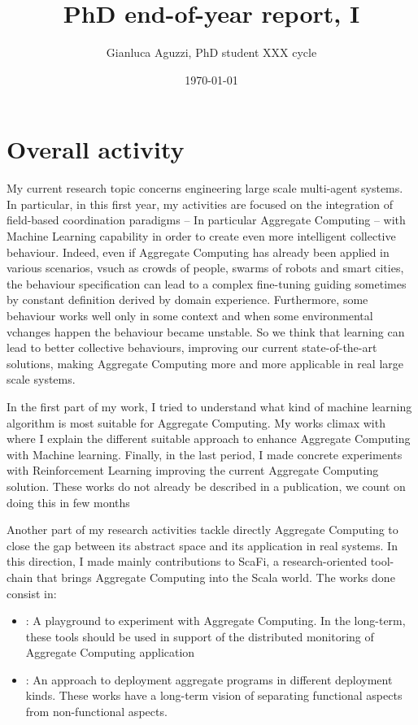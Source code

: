 \documentclass[12pt]{article}
\begin{document}
\title{PhD end-of-year report, I}
\author{Gianluca Aguzzi, PhD student XXX cycle}
\date{\today}
\maketitle

\section{Overall activity}
My current research topic concerns engineering large scale multi-agent systems.
 In particular, in this first year, my activities are focused on the integration of field-based coordination paradigms 
 -- In particular Aggregate Computing -- with Machine Learning capability 
 in order to create even more intelligent collective behaviour.
%
Indeed, even if Aggregate Computing has already been applied in various scenarios, 
vsuch as crowds of people, swarms of robots and smart cities, the behaviour specification can lead to
 a complex fine-tuning guiding sometimes by constant definition derived by domain experience.
%
Furthermore, some behaviour works well only in some context and when some environmental 
vchanges happen the behaviour became unstable.
%
So we think that learning can lead to better collective behaviours, 
 improving our current state-of-the-art solutions, making Aggregate 
 Computing more and more applicable in real large scale systems.

In the first part of my work, I tried to understand what 
 kind of machine learning algorithm is most suitable for Aggregate Computing.
%
My works climax with \textit{} where I explain the different suitable approach
 to enhance Aggregate Computing with Machine learning.
%
Finally, in the last period, I made concrete experiments with 
 Reinforcement Learning improving the current Aggregate Computing solution. 
 These works do not already be described in a publication,
 we count on doing this in few months

Another part of my research activities tackle directly Aggregate Computing to close the gap between
 its abstract space and its application in real systems. 
%
In this direction, I made mainly contributions to ScaFi, 
 a research-oriented tool-chain that brings Aggregate Computing 
 into the Scala world. The works done consist in:

\begin{itemize}
  \item \textit{}: 
	 A playground to experiment with Aggregate Computing. In the long-term, these tools should be used in support of
  the distributed monitoring of Aggregate Computing application
  \item \textit{}: 
	 An approach to deployment aggregate programs in different deployment kinds. These works have a long-term vision of separating functional aspects from non-functional aspects.
\end{itemize}
\end{document}
